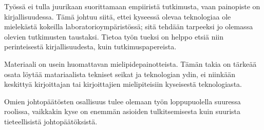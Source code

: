 \documentclass[finnish,12pt,a4paper,elec,utf8]{aaltothesis}
\begin{document}
Työssä ei tulla juurikaan suorittamaan empiiristä tutkimusta, vaan painopiste on kirjallisuudessa.
Tämä johtuu siitä, ettei kyseessä olevaa teknologiaa ole mielekästä kokeilla laboratorioympäristössä; sitä tehdään tarpeeksi jo olemassa olevien tutkimusten taustaksi.
Tietoa työn tueksi on helppo etsiä niin perinteisestä kirjallisuudesta, kuin tutkimuspapereista.

Materiaali on usein huomattavan mielipidepainotteista.
Tämän takia on tärkeää osata löytää matariaalista tekniset seikat ja teknologian ydin, ei niinkään keskittyä kirjoittajan tai kirjoittajien mielipiteisiin kyseisestä teknologiasta.

Omien johtopäätösten osallisuus tulee olemaan työn loppupuolella suuressa roolissa, vaikkakin kyse on enemmän asioiden tulkitsemisesta kuin suurista tieteellisistä johtopäätöksistä.

\newpage
\end{document}
